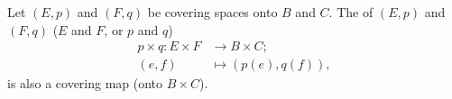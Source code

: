\documentclass[openany, oneside, a5paper]{book}
\begin{document}
\begin{theorem}
    Let $(E, p)$ and $(F, q)$ be covering spaces onto $B$ and $C$.
    The  of $(E, p)$ and $(F, q)$ ($E$ and $F$, or $p$ and $q$)
    \begin{align}
        p \times q \colon
         E \times F &\to B \times C;
         \\
         (e, f) &\mapsto (p(e), q(f)),
    \end{align}
    is also a covering map (onto $B \times C$).
\end{theorem}

\backmatter{}
\nocite{*} %
\printbibliography[heading=bibliography, title={bibliography}]

\printindex[symbol]

\printindex
\end{document}
